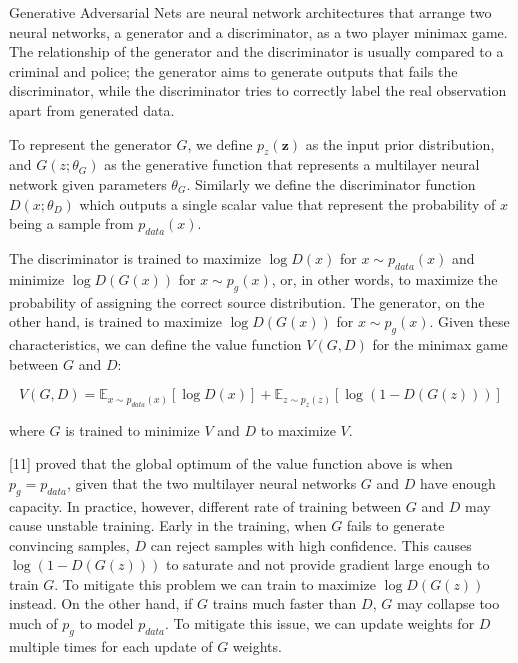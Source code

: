 \documentclass[12pt,a4paper,]{report}
\begin{document}
Generative Adversarial Nets are neural network architectures that
arrange two neural networks, a generator and a discriminator, as a two
player minimax game. The relationship of the generator and the
discriminator is usually compared to a criminal and police; the
generator aims to generate outputs that fails the discriminator, while
the discriminator tries to correctly label the real observation apart
from generated data.

To represent the generator \(G\), we define \(p_z(\mathbf{z})\) as the
input prior distribution, and \(G(z; \theta_G)\) as the generative
function that represents a multilayer neural network given parameters
\(\theta_G\). Similarly we define the discriminator function
\(D(x; \theta_D)\) which outputs a single scalar value that represent
the probability of \(x\) being a sample from \(p_{data}(x)\).

The discriminator is trained to maximize \(\log D(x)\) for
\(x \sim p_{data}(x)\) and minimize \(\log D(G(x))\) for
\(x \sim p_g(x)\), or, in other words, to maximize the probability of
assigning the correct source distribution. The generator, on the other
hand, is trained to maximize \(\log D(G(x))\) for \(x \sim p_g(x)\).
Given these characteristics, we can define the value function
\(V(G, D)\) for the minimax game between \(G\) and \(D\):

\begin{equation}
    V(G, D) = \mathbb{E}_{x \sim p_{data}(x)}[\log D(x)] + \mathbb{E}_{z \sim p_{z}(z)}[\log (1 - D(G(z)))] \label{eq:gan}
\end{equation}

where \(G\) is trained to minimize \(V\) and \(D\) to maximize \(V\).

{[}11{]} proved that the global optimum of the value function above is
when \(p_g = p_{data}\), given that the two multilayer neural networks
\(G\) and \(D\) have enough capacity. In practice, however, different
rate of training between \(G\) and \(D\) may cause unstable training.
Early in the training, when \(G\) fails to generate convincing samples,
\(D\) can reject samples with high confidence. This causes
\(\log (1 - D(G(z)))\) to saturate and not provide gradient large enough
to train \(G\). To mitigate this problem we can train to maximize
\(\log D(G(z))\) instead. On the other hand, if \(G\) trains much faster
than \(D\), \(G\) may collapse too much of \(p_g\) to model
\(p_{data}\). To mitigate this issue, we can update weights for \(D\)
multiple times for each update of \(G\) weights.
\end{document}

